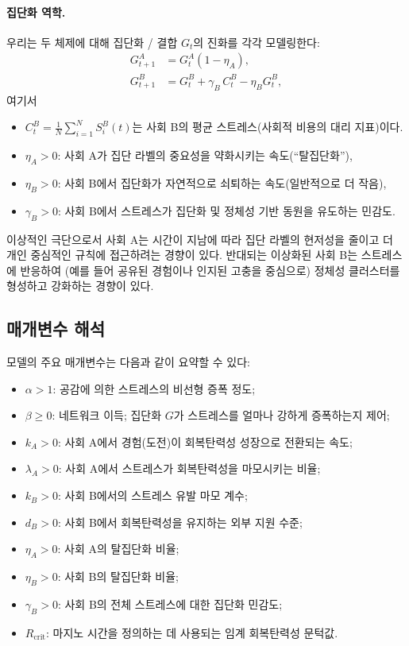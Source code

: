 \documentclass[11pt]{article}
\theoremstyle{plain}
\begin{document}
\paragraph{집단화 역학.}
우리는 두 체제에 대해 집단화 / 결합 $G_t$의 진화를 각각 모델링한다:
\begin{align}
G_{t+1}^A &= G_t^A (1 - \eta_A), \label{eq:GA}\\
G_{t+1}^B &= G_t^B + \gamma_B\, C_t^B - \eta_B G_t^B, \label{eq:GB}
\end{align}
여기서
\begin{itemize}
  \item $C_t^B = \frac{1}{N} \sum_{i=1}^N S_i^B(t)$는 사회 B의 평균 스트레스(사회적 비용의 대리 지표)이다.
  \item $\eta_A > 0$: 사회 A가 집단 라벨의 중요성을 약화시키는 속도(``탈집단화''),
  \item $\eta_B > 0$: 사회 B에서 집단화가 자연적으로 쇠퇴하는 속도(일반적으로 더 작음),
  \item $\gamma_B > 0$: 사회 B에서 스트레스가 집단화 및 정체성 기반 동원을 유도하는 민감도.
\end{itemize}

이상적인 극단으로서 사회 A는 시간이 지남에 따라 집단 라벨의 현저성을 줄이고 더 개인 중심적인 규칙에 접근하려는 경향이 있다.
반대되는 이상화된 사회 B는 스트레스에 반응하여 (예를 들어 공유된 경험이나 인지된 고충을 중심으로) 정체성 클러스터를 형성하고 강화하는 경향이 있다.

\subsection{매개변수 해석}

모델의 주요 매개변수는 다음과 같이 요약할 수 있다:
\begin{itemize}
  \item $\alpha > 1$: 공감에 의한 스트레스의 비선형 증폭 정도;
  \item $\beta \ge 0$: 네트워크 이득; 집단화 $G$가 스트레스를 얼마나 강하게 증폭하는지 제어;
  \item $k_A > 0$: 사회 A에서 경험(도전)이 회복탄력성 성장으로 전환되는 속도;
  \item $\lambda_A > 0$: 사회 A에서 스트레스가 회복탄력성을 마모시키는 비율;
  \item $k_B > 0$: 사회 B에서의 스트레스 유발 마모 계수;
  \item $d_B > 0$: 사회 B에서 회복탄력성을 유지하는 외부 지원 수준;
  \item $\eta_A > 0$: 사회 A의 탈집단화 비율;
  \item $\eta_B > 0$: 사회 B의 탈집단화 비율;
  \item $\gamma_B > 0$: 사회 B의 전체 스트레스에 대한 집단화 민감도;
  \item $R_{\text{crit}}$: 마지노 시간을 정의하는 데 사용되는 임계 회복탄력성 문턱값.
\end{itemize}
\end{document}
